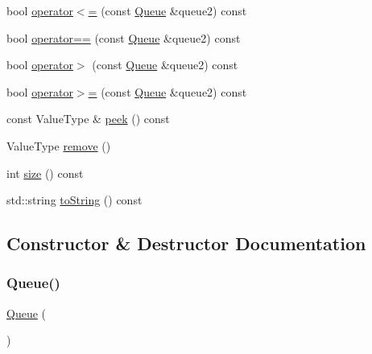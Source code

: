 \begin{DoxyCompactItemize}
\item 
bool \mbox{\hyperlink{classQueue_aea83f9b16703e7b7a1e46e0746f608c0}{operator$<$=}} (const \mbox{\hyperlink{classQueue}{Queue}} \&queue2) const
\item 
bool \mbox{\hyperlink{classQueue_a85514d93aa9c51e072e2f16ed37ee889}{operator==}} (const \mbox{\hyperlink{classQueue}{Queue}} \&queue2) const
\item 
bool \mbox{\hyperlink{classQueue_afb42a4f29f0857da53e102eb8f77eea6}{operator$>$}} (const \mbox{\hyperlink{classQueue}{Queue}} \&queue2) const
\item 
bool \mbox{\hyperlink{classQueue_ad18096c65e1e4666a4103b559d2c2acd}{operator$>$=}} (const \mbox{\hyperlink{classQueue}{Queue}} \&queue2) const
\item 
const Value\+Type \& \mbox{\hyperlink{classQueue_a74501ededf728c31068dd28a70a8a1f2}{peek}} () const
\item 
Value\+Type \mbox{\hyperlink{classQueue_a025ec97fa5b04552f5ad0902c1f02ac1}{remove}} ()
\item 
int \mbox{\hyperlink{classQueue_af9593d4a5ff4274efaf429cb4f9e57cc}{size}} () const
\item 
std\+::string \mbox{\hyperlink{classQueue_a1fe5121d6528fdea3f243321b3fa3a49}{to\+String}} () const
\end{DoxyCompactItemize}


\subsection{Constructor \& Destructor Documentation}
\mbox{\label{classQueue_a661ad33bec307cc237c318c39970e78f}} 
\subsubsection{\texorpdfstring{Queue()}{Queue()}\hspace{0.1cm}{\footnotesize\ttfamily [1/2]}}
{\footnotesize\ttfamily \mbox{\hyperlink{classQueue}{Queue}} (\begin{DoxyParamCaption}{ }\end{DoxyParamCaption})\hspace{0.3cm}{\ttfamily [default]}}

\mbox{\label{classQueue_a0ad6572f7c8e567d440ef6735d2f4a32}} 
